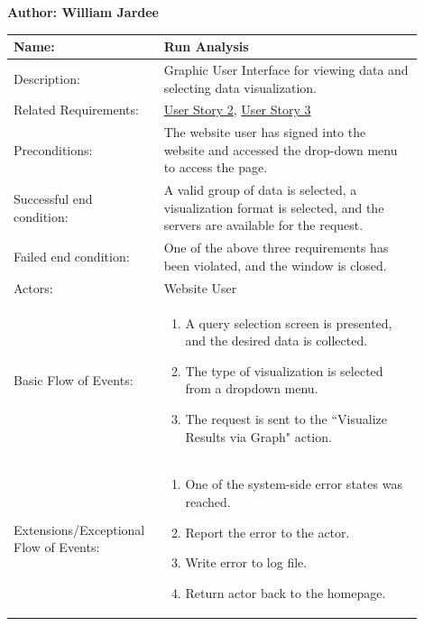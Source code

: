 \documentclass[11pt]{article}
\begin{document}
\begin{table}[!ht]
\begin{center}
\textbf{Author: William Jardee}
\vspace*{1em}

\begin{tabular}{p{0.30\linewidth}p{0.60\linewidth}}
	Name: & Run Analysis\\\hline
	Description: & Graphic User Interface for viewing data and selecting data visualization.\\\hline
	Related Requirements:& \hyperlink{us2}{User Story 2}, \hyperlink{us3}{User Story 3}\\\hline
	Preconditions:& The website user has signed into the website and accessed the drop-down menu to access the page. \\\hline
	Successful end condition:& A valid group of data is selected, a visualization format is selected, and the servers are available for the request.\\\hline
	Failed end condition:& One of the above three requirements has been violated, and the window is closed.\\\hline
	Actors:& Website User\\\hline
	Basic Flow of Events: & \begin{enumerate}
	\item A query selection screen is presented, and the desired data is collected.
	\item The type of visualization is selected from a dropdown menu.
	\item The request is sent to the ``Visualize Results via Graph" action.
	\end{enumerate}\\\hline
	Extensions/Exceptional Flow of Events: & \begin{enumerate}
	\item One of the system-side error states was reached.
	\item Report the error to the actor.
	\item Write error to log file.
	\item Return actor back to the homepage.
	\end{enumerate}
\end{tabular}
\label{des:run_anal}	
\end{center}
\end{table}
\end{document}
